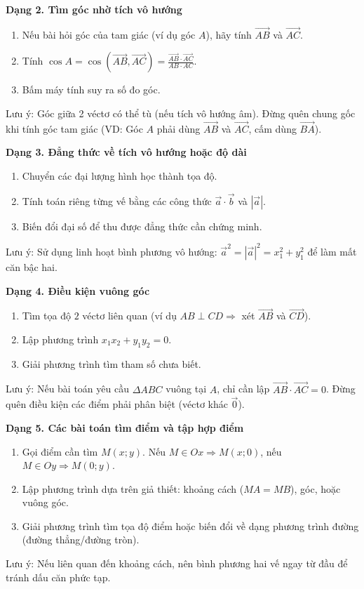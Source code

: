 \textbf{Dạng 2. Tìm góc nhờ tích vô hướng}
\begin{enumerate}
\item Nếu bài hỏi góc của tam giác (ví dụ góc $A$), hãy tính $\overrightarrow{AB}$ và $\overrightarrow{AC}$.
\item Tính $\cos A = \cos(\overrightarrow{AB}, \overrightarrow{AC}) = \frac{\overrightarrow{AB} \cdot \overrightarrow{AC}}{AB \cdot AC}$.
\item Bấm máy tính suy ra số đo góc.
\end{enumerate}
Lưu ý: Góc giữa 2 véctơ có thể tù (nếu tích vô hướng âm). Đừng quên chung gốc khi tính góc tam giác (VD: Góc $A$ phải dùng $\overrightarrow{AB}$ và $\overrightarrow{AC}$, cấm dùng $\overrightarrow{BA}$).

\textbf{Dạng 3. Đẳng thức về tích vô hướng hoặc độ dài}
\begin{enumerate}
\item Chuyển các đại lượng hình học thành tọa độ.
\item Tính toán riêng từng vế bằng các công thức $\overrightarrow{a} \cdot \overrightarrow{b}$ và $|\overrightarrow{a}|$.
\item Biến đổi đại số để thu được đẳng thức cần chứng minh.
\end{enumerate}
Lưu ý: Sử dụng linh hoạt bình phương vô hướng: $\overrightarrow{a}^2 = |\overrightarrow{a}|^2 = x_1^2 + y_1^2$ để làm mất căn bậc hai.

\textbf{Dạng 4. Điều kiện vuông góc}
\begin{enumerate}
\item Tìm tọa độ $2$ véctơ liên quan (ví dụ $AB \perp CD \Rightarrow$ xét $\overrightarrow{AB}$ và $\overrightarrow{CD}$).
\item Lập phương trình $x_1 x_2 + y_1 y_2 = 0$.
\item Giải phương trình tìm tham số chưa biết.
\end{enumerate}
Lưu ý: Nếu bài toán yêu cầu $\Delta ABC$ vuông tại $A$, chỉ cần lập $\overrightarrow{AB} \cdot \overrightarrow{AC} = 0$. Đừng quên điều kiện các điểm phải phân biệt (véctơ khác $\overrightarrow{0}$).

\textbf{Dạng 5. Các bài toán tìm điểm và tập hợp điểm}
\begin{enumerate}
\item Gọi điểm cần tìm $M(x; y)$. Nếu $M \in Ox \Rightarrow M(x; 0)$, nếu $M \in Oy \Rightarrow M(0; y)$.
\item Lập phương trình dựa trên giả thiết: khoảng cách ($MA = MB$), góc, hoặc vuông góc.
\item Giải phương trình tìm tọa độ điểm hoặc biến đổi về dạng phương trình đường (đường thẳng/đường tròn).
\end{enumerate}
Lưu ý: Nếu liên quan đến khoảng cách, nên bình phương hai vế ngay từ đầu để tránh dấu căn phức tạp.


